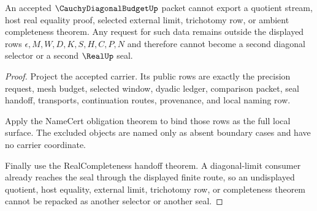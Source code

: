 \begin{theorem}
\label{thm:cauchy-diagonal-budget-nonescape}
An accepted $\CauchyDiagonalBudgetUp$ packet cannot export a quotient stream, host real equality proof, selected external limit, trichotomy row, or ambient completeness theorem. Any request for such data remains outside the displayed rows $\epsilon,M,W,D,K,S,H,C,P,N$ and therefore cannot become a second diagonal selector or a second $\RealUp$ seal.
\end{theorem}
\begin{proof}
Project the accepted carrier. Its public rows are exactly the precision request, mesh budget, selected window, dyadic ledger, comparison packet, seal handoff, transports, continuation routes, provenance, and local naming row.

Apply the NameCert obligation theorem to bind those rows as the full local surface. The excluded objects are named only as absent boundary cases and have no carrier coordinate.

Finally use the RealCompleteness handoff theorem. A diagonal-limit consumer already reaches the seal through the displayed finite route, so an undisplayed quotient, host equality, external limit, trichotomy row, or completeness theorem cannot be repacked as another selector or another seal.
\end{proof}

